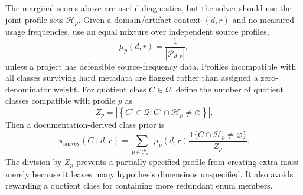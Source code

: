 \documentclass[11pt]{article}
\newcommand{\abs}[1]{\left\lvert #1 \right\rvert}
\newcommand{\set}[1]{\left\{ #1 \right\}}
\begin{document}
    The marginal scores above are useful diagnostics, but the solver should use the joint
    profile sets $\mathcal H_p$. Given a domain/artifact context $(d,r)$ and no measured
    usage frequencies, use an equal mixture over independent source profiles,
    \begin{equation}
        \mu_p(d,r)=\frac{1}{\abs{\mathcal P_{d,r}}},
    \end{equation}
    unless a project has defensible source-frequency data. Profiles incompatible with all
    classes surviving hard metadata are flagged rather than assigned a zero-denominator
    weight. For quotient class $C\in\mathcal Q$, define the number of quotient classes
    compatible with profile $p$ as
    \begin{equation}
        Z_p=\abs{\set{C'\in\mathcal Q:C'\cap\mathcal H_p\ne\varnothing}}.
    \end{equation}
    Then a documentation-derived class prior is
    \begin{equation}
        \pi_{\mathrm{survey}}(C\mid d,r)
        =
        \sum_{p\in\mathcal P_{d,r}}
        \mu_p(d,r)
        \frac{\mathbf 1\{C\cap\mathcal H_p\ne\varnothing\}}{Z_p}.
        \label{eq:survey-class-prior}
    \end{equation}
    The division by $Z_p$ prevents a partially specified profile from creating extra mass
    merely because it leaves many hypothesis dimensions unspecified. It also avoids
    rewarding a quotient class for containing more redundant enum members.
\end{document}
